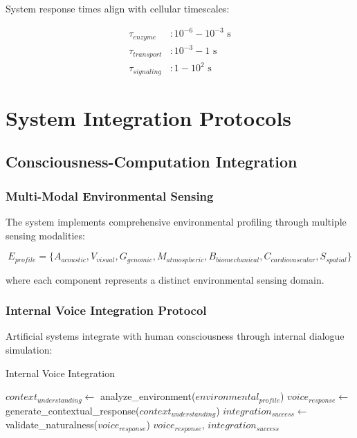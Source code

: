 \documentclass[12pt,a4paper]{article}
\begin{document}
System response times align with cellular timescales:

\begin{align}
\tau_{enzyme} &: 10^{-6} - 10^{-3} \text{ s} \\
\tau_{transport} &: 10^{-3} - 1 \text{ s} \\
\tau_{signaling} &: 1 - 10^2 \text{ s}
\end{align}

\section{System Integration Protocols}

\subsection{Consciousness-Computation Integration}

\subsubsection{Multi-Modal Environmental Sensing}

The system implements comprehensive environmental profiling through multiple sensing modalities:

\begin{equation}
E_{profile} = \{A_{acoustic}, V_{visual}, G_{genomic}, M_{atmospheric}, B_{biomechanical}, C_{cardiovascular}, S_{spatial}\}
\end{equation}

where each component represents a distinct environmental sensing domain.

\subsubsection{Internal Voice Integration Protocol}

Artificial systems integrate with human consciousness through internal dialogue simulation:

\begin{algorithm}
\caption{Internal Voice Integration}
\begin{algorithmic}
    \State $context_{understanding} \leftarrow$ analyze\_environment($environmental_{profile}$)
    \State $voice_{response} \leftarrow$ generate\_contextual\_response($context_{understanding}$)
    \State $integration_{success} \leftarrow$ validate\_naturalness($voice_{response}$)
    \State \Return $voice_{response}$, $integration_{success}$
\EndProcedure
\end{algorithmic}
\end{algorithm}
\end{document}
